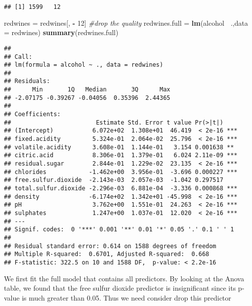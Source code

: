 \documentclass[
]{article}
\newenvironment{Shaded}{\begin{snugshade}}{\end{snugshade}}
\newcommand{\CommentTok}[1]{\textcolor[rgb]{0.56,0.35,0.01}{\textit{#1}}}
\newcommand{\DataTypeTok}[1]{\textcolor[rgb]{0.13,0.29,0.53}{#1}}
\newcommand{\DecValTok}[1]{\textcolor[rgb]{0.00,0.00,0.81}{#1}}
\newcommand{\KeywordTok}[1]{\textcolor[rgb]{0.13,0.29,0.53}{\textbf{#1}}}
\newcommand{\NormalTok}[1]{#1}
\newcommand{\OperatorTok}[1]{\textcolor[rgb]{0.81,0.36,0.00}{\textbf{#1}}}
\newcommand{\StringTok}[1]{\textcolor[rgb]{0.31,0.60,0.02}{#1}}
\begin{document}
\begin{verbatim}
## [1] 1599   12
\end{verbatim}

\begin{Shaded}
\begin{Highlighting}[]
\NormalTok{redwines =}\StringTok{ }\NormalTok{redwines[, }\OperatorTok{-}\StringTok{ }\DecValTok{12}\NormalTok{] }\CommentTok{#drop the quality}
\NormalTok{redwines.full =}\StringTok{ }\KeywordTok{lm}\NormalTok{(alcohol }\OperatorTok{~}\NormalTok{.,}\DataTypeTok{data =}\NormalTok{ redwines)}
\KeywordTok{summary}\NormalTok{(redwines.full)}
\end{Highlighting}
\end{Shaded}

\begin{verbatim}
## 
## Call:
## lm(formula = alcohol ~ ., data = redwines)
## 
## Residuals:
##      Min       1Q   Median       3Q      Max 
## -2.07175 -0.39267 -0.04056  0.35396  2.44365 
## 
## Coefficients:
##                        Estimate Std. Error t value Pr(>|t|)    
## (Intercept)           6.072e+02  1.308e+01  46.419  < 2e-16 ***
## fixed.acidity         5.324e-01  2.064e-02  25.796  < 2e-16 ***
## volatile.acidity      3.608e-01  1.144e-01   3.154 0.001638 ** 
## citric.acid           8.306e-01  1.379e-01   6.024 2.11e-09 ***
## residual.sugar        2.844e-01  1.229e-02  23.135  < 2e-16 ***
## chlorides            -1.462e+00  3.956e-01  -3.696 0.000227 ***
## free.sulfur.dioxide  -2.143e-03  2.057e-03  -1.042 0.297517    
## total.sulfur.dioxide -2.296e-03  6.881e-04  -3.336 0.000868 ***
## density              -6.174e+02  1.342e+01 -45.998  < 2e-16 ***
## pH                    3.762e+00  1.551e-01  24.263  < 2e-16 ***
## sulphates             1.247e+00  1.037e-01  12.020  < 2e-16 ***
## ---
## Signif. codes:  0 '***' 0.001 '**' 0.01 '*' 0.05 '.' 0.1 ' ' 1
## 
## Residual standard error: 0.614 on 1588 degrees of freedom
## Multiple R-squared:  0.6701, Adjusted R-squared:  0.668 
## F-statistic: 322.5 on 10 and 1588 DF,  p-value: < 2.2e-16
\end{verbatim}

We first fit the full model that contains all predictors. By looking at
the Anova table, we found that the free sulfur dioxide predictor is
insignificant since its p-value is much greater than 0.05. Thus we need
consider drop this predictor
\end{document}
